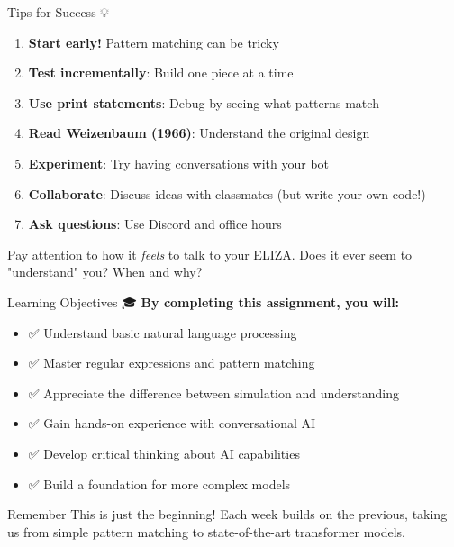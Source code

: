 \documentclass[aspectratio=169]{beamer}
\begin{document}
\begin{frame}[shrink=10]{Tips for Success 💡}
\small
\begin{enumerate}\setlength{\itemsep}{0pt}
    \item \textbf{Start early!} Pattern matching can be tricky
    \item \textbf{Test incrementally}: Build one piece at a time
    \item \textbf{Use print statements}: Debug by seeing what patterns match
    \item \textbf{Read Weizenbaum (1966)}: Understand the original design
    \item \textbf{Experiment}: Try having conversations with your bot
    \item \textbf{Collaborate}: Discuss ideas with classmates (but write your own code!)
    \item \textbf{Ask questions}: Use Discord and office hours
\end{enumerate}

\vspace{0.3cm}

\begin{thinkaboutit}
Pay attention to how it \textit{feels} to talk to your ELIZA. Does it ever seem to "understand" you? When and why?
\end{thinkaboutit}
\end{frame}

\begin{frame}[shrink=10]{Learning Objectives 🎓}
\small
\textbf{By completing this assignment, you will:}

\begin{itemize}\setlength{\itemsep}{0pt}
    \item ✅ Understand basic natural language processing
    \item ✅ Master regular expressions and pattern matching
    \item ✅ Appreciate the difference between simulation and understanding
    \item ✅ Gain hands-on experience with conversational AI
    \item ✅ Develop critical thinking about AI capabilities
    \item ✅ Build a foundation for more complex models
\end{itemize}

\vspace{0.3cm}

\begin{block}{Remember}
This is just the beginning! Each week builds on the previous, taking us from simple pattern matching to state-of-the-art transformer models.
\end{block}
\end{frame}
\end{document}
